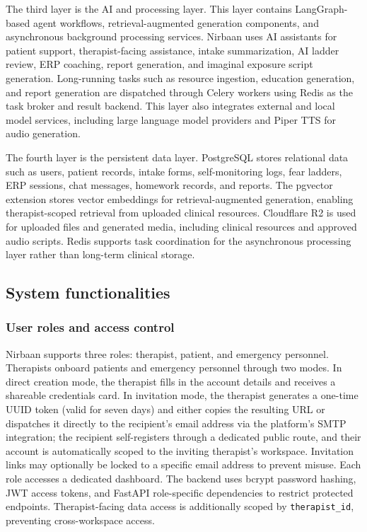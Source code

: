 \documentclass[preprint,12pt,a4paper]{elsarticle}
\begin{document}
The third layer is the AI and processing layer. This layer contains LangGraph-based agent workflows, retrieval-augmented generation components, and asynchronous background processing services. Nirbaan uses AI assistants for patient support, therapist-facing assistance, intake summarization, AI ladder review, ERP coaching, report generation, and imaginal exposure script generation. Long-running tasks such as resource ingestion, education generation, and report generation are dispatched through Celery workers using Redis as the task broker and result backend. This layer also integrates external and local model services, including large language model providers and Piper TTS for audio generation.

The fourth layer is the persistent data layer. PostgreSQL stores relational data such as users, patient records, intake forms, self-monitoring logs, fear ladders, ERP sessions, chat messages, homework records, and reports. The pgvector extension stores vector embeddings for retrieval-augmented generation, enabling therapist-scoped retrieval from uploaded clinical resources. Cloudflare R2 is used for uploaded files and generated media, including clinical resources and approved audio scripts. Redis supports task coordination for the asynchronous processing layer rather than long-term clinical storage.

\subsection{System functionalities}

\subsubsection{User roles and access control}

Nirbaan supports three roles: therapist, patient, and emergency personnel. Therapists onboard patients and emergency personnel through two modes. In direct creation mode, the therapist fills in the account details and receives a shareable credentials card. In invitation mode, the therapist generates a one-time UUID token (valid for seven days) and either copies the resulting URL or dispatches it directly to the recipient's email address via the platform's SMTP integration; the recipient self-registers through a dedicated public route, and their account is automatically scoped to the inviting therapist's workspace. Invitation links may optionally be locked to a specific email address to prevent misuse. Each role accesses a dedicated dashboard. The backend uses bcrypt password hashing, JWT access tokens, and FastAPI role-specific dependencies to restrict protected endpoints. Therapist-facing data access is additionally scoped by \texttt{therapist\_id}, preventing cross-workspace access.
\end{document}
